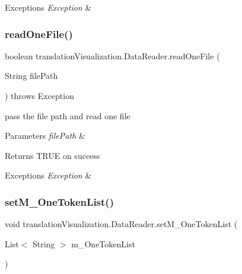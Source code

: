 \begin{DoxyExceptions}{Exceptions}
{\em Exception} & \\
\hline
\end{DoxyExceptions}
\mbox{\label{classtranslation_visualization_1_1_data_reader_afd65c90eabcb680ccb187aeeb8d0fa49}} 
\subsubsection{\texorpdfstring{read\+One\+File()}{readOneFile()}}
{\footnotesize\ttfamily boolean translation\+Visualization.\+Data\+Reader.\+read\+One\+File (\begin{DoxyParamCaption}\item[{String}]{file\+Path }\end{DoxyParamCaption}) throws Exception\hspace{0.3cm}{\ttfamily [inline]}}

pass the file path and read one file 
\begin{DoxyParams}{Parameters}
{\em file\+Path} & \\
\hline
\end{DoxyParams}
\begin{DoxyReturn}{Returns}
T\+R\+UE on success 
\end{DoxyReturn}

\begin{DoxyExceptions}{Exceptions}
{\em Exception} & \\
\hline
\end{DoxyExceptions}
\mbox{\label{classtranslation_visualization_1_1_data_reader_a6ae3b7c60cbbad3269bc35c03e25b65d}} 
\subsubsection{\texorpdfstring{set\+M\+\_\+\+One\+Token\+List()}{setM\_OneTokenList()}}
{\footnotesize\ttfamily void translation\+Visualization.\+Data\+Reader.\+set\+M\+\_\+\+One\+Token\+List (\begin{DoxyParamCaption}\item[{List$<$ String $>$}]{m\+\_\+\+One\+Token\+List }\end{DoxyParamCaption})\hspace{0.3cm}{\ttfamily [inline]}}

